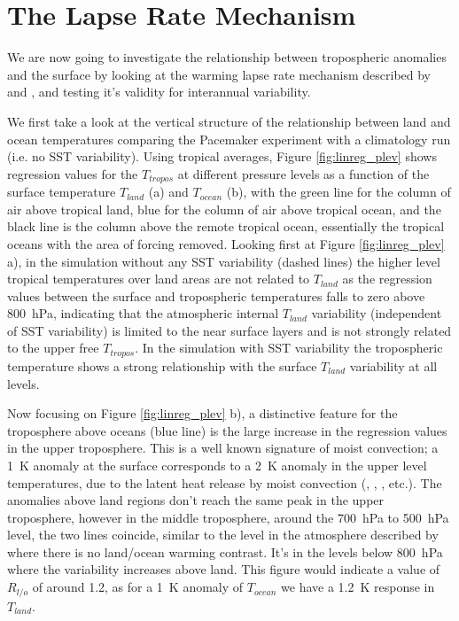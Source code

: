 
\section{The Lapse Rate Mechanism}

We are now going to investigate the relationship between tropospheric anomalies 
and the surface by looking at the warming lapse rate mechanism described by 
\citet{Joshi2007} and \citet{Byrne2013a}, and testing it's validity for 
interannual variability. 

We first take a look at the vertical structure of the relationship between land 
and ocean temperatures comparing the Pacemaker experiment with a climatology run 
(i.e. no SST variability).  Using tropical averages, Figure 
\ref{fig:linreg_plev} shows regression values for the $T_{tropos}$ at different 
pressure levels as a function of the surface temperature $T_{land}$ (a) and 
$T_{ocean}$ (b), with the green line for the column of air above tropical land, 
blue for the column of air above tropical ocean, and the black line is the 
column above the remote tropical ocean, essentially the tropical oceans with the 
area of forcing removed.  Looking first at Figure \ref{fig:linreg_plev} a), in 
the simulation without any SST variability (dashed lines) the higher level 
tropical temperatures over land areas are not related to $T_{land}$ as the 
regression values between the surface and tropospheric temperatures falls to 
zero above \SI{800}{\hecto\pascal}, indicating that the atmospheric internal 
$T_{land}$ variability (independent of SST variability) is limited to the near 
surface layers and is not strongly related to the upper free $T_{tropos}$. In 
the simulation with SST variability the tropospheric temperature shows a strong 
relationship with the surface $T_{land}$ variability at all levels. 

Now focusing on Figure \ref{fig:linreg_plev} b), a distinctive feature for the 
troposphere above oceans (blue line) is the large increase in the regression 
values in the upper troposphere. This is a well known signature of moist
convection; a \SI{1}{\kelvin} anomaly at the surface corresponds to a 
\SI{2}{\kelvin} anomaly in the upper level temperatures, due to the latent heat 
release by moist convection (\citet{Joshi2007}, \citet{Byrne2013}, 
\citet{Dommenget2009}, etc.). The anomalies above land regions don't reach the 
same peak in the upper troposphere, however in the middle troposphere, around 
the \SI{700}{\hecto\pascal} to \SI{500}{\hecto\pascal} level, the two lines 
coincide, similar to the level in the atmosphere described by \citet{Joshi2007} 
where there is no land/ocean warming contrast. It's in the levels below 
\SI{800}{\hecto\pascal} where the variability increases above land. This figure 
would indicate a value of $R_{l/o}$ of around 1.2, as for a \SI{1}{\kelvin} 
anomaly of $T_{ocean}$ we have a \SI{1.2}{\kelvin} response in $T_{land}$.  

